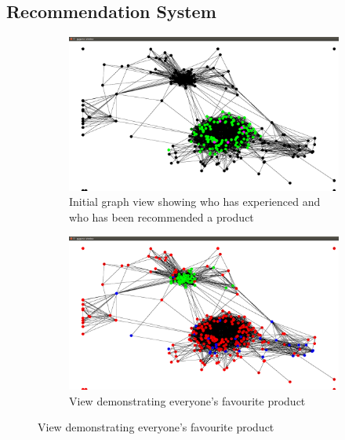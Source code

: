 \documentclass[12pt,a4paper]{article}
\begin{document}
\subsection{Recommendation System}

\begin{figure}
\centering
	\begin{subfigure}[b]{0.4\linewidth}
	\caption{Initial graph view showing who has experienced and who has been recommended a product}
	\label{fig:recommendationInitial}
	\includegraphics[scale=0.1]{Recommendation1.png}
	\end{subfigure}
\quad
	\begin{subfigure}[b]{0.4\linewidth}
	\caption{View demonstrating everyone's favourite product}
	\label{fig:recommendationFavourite}
	\includegraphics[scale=0.1]{Recommendation2.png}
	\end{subfigure}
	

\end{figure}
\end{document}
